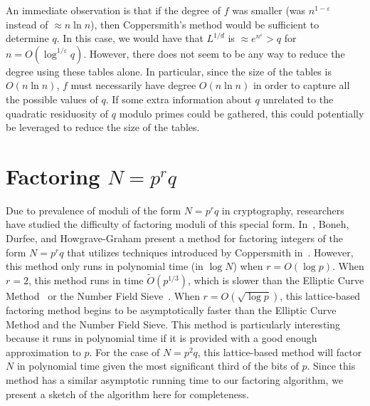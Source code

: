 \documentclass[letterpaper,twocolumn,10pt]{article}
\begin{document}
An immediate observation is that if the degree of $f$ was smaller (was $n^{1 - \varepsilon}$ instead of $\approx n \ln n$), then Coppersmith's method would be sufficient to determine $q$. In this case, we would have that $L^{1/d}$ is $\approx e^{n^{\varepsilon}} > q$ for $n = O(\log^{1/\varepsilon} q)$. However, there does not seem to be any way to reduce the degree using these tables alone. In particular, since the size of the tables is $O(n \ln n)$, $f$ must necessarily have degree $O(n \ln n)$ in order to capture all the possible values of $q$. If some extra information about $q$ unrelated to the quadratic residuosity of $q$ modulo primes could be gathered, this could potentially be leveraged to reduce the size of the tables. 

\section{Factoring $N = p^rq$}

Due to prevalence of moduli of the form $N = p^r q$ in cryptography, researchers have studied the difficulty of factoring moduli of this special form. In~\cite{dan}, Boneh, Durfee, and Howgrave-Graham present a method for factoring integers of the form $N = p^r q$ that utilizes techniques introduced by Coppersmith in~\cite{Coppersmith1997}. However, this method only runs in polynomial time (in $\log N$) when $r = O(\log p)$. When $r = 2$, this method runs in time $\tilde{O}(p^{1/3})$, which is slower than the Elliptic Curve Method~\cite{Lenstra} or the Number Field Sieve~\cite{pomerance}. When $r = O(\sqrt{\log p})$, this lattice-based factoring method begins to be asymptotically faster than the Elliptic Curve Method and the Number Field Sieve. This method is particularly interesting because it runs in polynomial time if it is provided with a good enough approximation to $p$. For the case of $N = p^2 q$, this lattice-based method will factor $N$ in polynomial time given the most significant third of the bits of $p$. Since this method has a similar asymptotic running time to our factoring algorithm, we present a sketch of the algorithm here for completeness.
\end{document}
